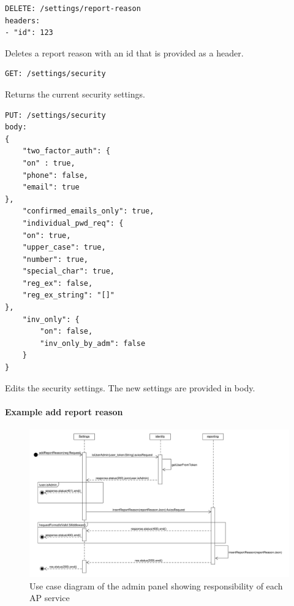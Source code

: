 \begin{lstlisting}
DELETE: /settings/report-reason
headers:
- "id": 123
\end{lstlisting}

Deletes a report reason with an id that is provided as a header.

\begin{lstlisting}
GET: /settings/security
\end{lstlisting}

Returns the current security settings.

\begin{lstlisting}
PUT: /settings/security
body:
{
    "two_factor_auth": {
    "on" : true,
    "phone": false,
    "email": true
},
    "confirmed_emails_only": true,
    "individual_pwd_req": {
    "on": true,
    "upper_case": true,
    "number": true,
    "special_char": true,
    "reg_ex": false,
    "reg_ex_string": "[]"
},
    "inv_only": {
        "on": false,
        "inv_only_by_adm": false
    }
}
\end{lstlisting}

Edits the security settings.
The new settings are provided in body.

\paragraph{Example add report reason}

\begin{figure}[!ht]
    \centering
    \includegraphics[width=1.0\textwidth]{./images/SequenceDiagram_AddReportReason}
    \caption{Use case diagram of the admin panel showing responsibility of each AP service}
    \label{fig:addReportReason}
\end{figure}

